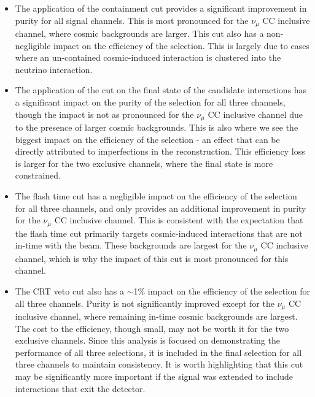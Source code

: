 \begin{itemize}
    \item The application of the containment cut provides a significant improvement in purity for all signal channels. This is most pronounced for the $\nu_\mu$ CC inclusive channel, where cosmic backgrounds are larger. This cut also has a non-negligible impact on the efficiency of the selection. This is largely due to cases where an un-contained cosmic-induced interaction is clustered into the neutrino interaction.
    \item The application of the cut on the final state of the candidate interactions has a significant impact on the purity of the selection for all three channels, though the impact is not as pronounced for the $\nu_\mu$ CC inclusive channel due to the presence of larger cosmic backgrounds. This is also where we see the biggest impact on the efficiency of the selection - an effect that can be directly attributed to imperfections in the reconstruction. This efficiency loss is larger for the two exclusive channels, where the final state is more constrained.
    \item The flash time cut has a negligible impact on the efficiency of the selection for all three channels, and only provides an additional improvement in purity for the $\nu_\mu$ CC inclusive channel. This is consistent with the expectation that the flash time cut primarily targets cosmic-induced interactions that are not in-time with the beam. These backgrounds are largest for the $\nu_\mu$ CC inclusive channel, which is why the impact of this cut is most pronounced for this channel.
    \item The CRT veto cut also has a $\sim$1\% impact on the efficiency of the selection for all three channels. Purity is not significantly improved except for the $\nu_\mu$ CC inclusive channel, where remaining in-time cosmic backgrounds are largest. The cost to the efficiency, though small, may not be worth it for the two exclusive channels. Since this analysis is focused on demonstrating the performance of all three selections, it is included in the final selection for all three channels to maintain consistency. It is worth highlighting that this cut may be significantly more important if the signal was extended to include interactions that exit the detector.
\end{itemize}

